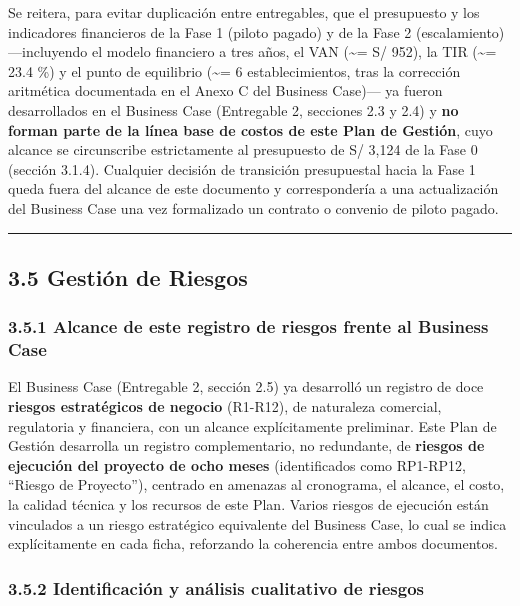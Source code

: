 \documentclass[11pt,a4paper]{article}
\begin{document}
Se reitera, para evitar duplicación entre entregables, que el presupuesto y los indicadores financieros de la Fase 1 (piloto pagado) y de la Fase 2 (escalamiento) ---incluyendo el modelo financiero a tres años, el VAN (\textasciitilde= S/ 952), la TIR (\textasciitilde= 23.4 \%) y el punto de equilibrio (\textasciitilde= 6 establecimientos, tras la corrección aritmética documentada en el Anexo C del Business Case)--- ya fueron desarrollados en el Business Case (Entregable 2, secciones 2.3 y 2.4) y \textbf{no forman parte de la línea base de costos de este Plan de Gestión}, cuyo alcance se circunscribe estrictamente al presupuesto de S/ 3,124 de la Fase 0 (sección 3.1.4). Cualquier decisión de transición presupuestal hacia la Fase 1 queda fuera del alcance de este documento y correspondería a una actualización del Business Case una vez formalizado un contrato o convenio de piloto pagado.

\begin{center}\rule{0.5\linewidth}{0.5pt}\end{center}

\subsection{3.5 Gestión de Riesgos}\label{gestiuxf3n-de-riesgos}

\subsubsection{3.5.1 Alcance de este registro de riesgos frente al Business Case}\label{alcance-de-este-registro-de-riesgos-frente-al-business-case}

El Business Case (Entregable 2, sección 2.5) ya desarrolló un registro de doce \textbf{riesgos estratégicos de negocio} (R1-R12), de naturaleza comercial, regulatoria y financiera, con un alcance explícitamente preliminar. Este Plan de Gestión desarrolla un registro complementario, no redundante, de \textbf{riesgos de ejecución del proyecto de ocho meses} (identificados como RP1-RP12, ``Riesgo de Proyecto''), centrado en amenazas al cronograma, el alcance, el costo, la calidad técnica y los recursos de este Plan. Varios riesgos de ejecución están vinculados a un riesgo estratégico equivalente del Business Case, lo cual se indica explícitamente en cada ficha, reforzando la coherencia entre ambos documentos.

\subsubsection{3.5.2 Identificación y análisis cualitativo de riesgos}\label{identificaciuxf3n-y-anuxe1lisis-cualitativo-de-riesgos}
\end{document}
